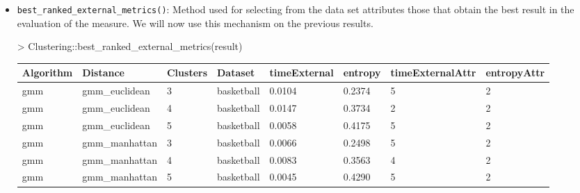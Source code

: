 \begin{itemize}
  \item \texttt{best\_ranked\_external\_metrics()}: Method used for selecting from the data set attributes those that obtain the best result in the evaluation of the measure. We will now use this mechanism on the previous results.

  \begin{Schunk}
\begin{Sinput}
> Clustering::best_ranked_external_metrics(result)
\end{Sinput}
\end{Schunk}
\begin{table}[h!]
\centering
\begin{tabular}{| p{1cm} | p{1.8cm} | p{0.9cm} | p{1.1cm} | p{1.6cm} | p{0.8cm} | p{1.8cm} | p{1.5cm} |}
\hline
\scriptsize Algorithm  & \scriptsize     Distance    &  \scriptsize Clusters &  \scriptsize  Dataset   & \scriptsize timeExternal  & \scriptsize entropy   & \scriptsize timeExternalAttr & \scriptsize entropyAttr \\
\hline
\scriptsize   gmm      & \scriptsize   gmm\_euclidean & \scriptsize     3     & \scriptsize basketball  & \scriptsize     0.0104    & \scriptsize 0.2374 &  \scriptsize        5        & \scriptsize      2 \\
\scriptsize   gmm      & \scriptsize   gmm\_euclidean & \scriptsize     4     & \scriptsize basketball  & \scriptsize     0.0147    & \scriptsize 0.3734 &  \scriptsize        2        & \scriptsize      2\\
\scriptsize   gmm      & \scriptsize   gmm\_euclidean & \scriptsize     5     & \scriptsize basketball  & \scriptsize     0.0058    & \scriptsize 0.4175 &  \scriptsize        5        & \scriptsize      2 \\
\cline{2-8}
\scriptsize   gmm      & \scriptsize   gmm\_manhattan & \scriptsize     3     & \scriptsize basketball  & \scriptsize     0.0066    & \scriptsize 0.2498 &  \scriptsize        5        & \scriptsize      2 \\
\scriptsize   gmm      & \scriptsize   gmm\_manhattan & \scriptsize     4     & \scriptsize basketball  & \scriptsize     0.0083    & \scriptsize 0.3563 &  \scriptsize        4        & \scriptsize      2 \\
\scriptsize   gmm      & \scriptsize   gmm\_manhattan & \scriptsize     5     & \scriptsize basketball  & \scriptsize     0.0045    & \scriptsize 0.4290 &  \scriptsize        5        & \scriptsize      2 \\

\end{tabular}
\end{table}
\end{itemize}
